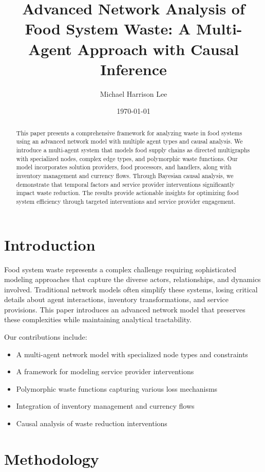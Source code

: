 \documentclass[12pt]{article}
\title{Advanced Network Analysis of Food System Waste: A Multi-Agent Approach with Causal Inference}
\author{Michael Harrison Lee}
\date{\today}
\theoremstyle{definition}
\begin{document}
\maketitle

\begin{abstract}
This paper presents a comprehensive framework for analyzing waste in food systems using an advanced network model with multiple agent types and causal analysis. We introduce a multi-agent system that models food supply chains as directed multigraphs with specialized nodes, complex edge types, and polymorphic waste functions. Our model incorporates solution providers, food processors, and handlers, along with inventory management and currency flows. Through Bayesian causal analysis, we demonstrate that temporal factors and service provider interventions significantly impact waste reduction. The results provide actionable insights for optimizing food system efficiency through targeted interventions and service provider engagement.
\end{abstract}

\section{Introduction}
Food system waste represents a complex challenge requiring sophisticated modeling approaches that capture the diverse actors, relationships, and dynamics involved. Traditional network models often simplify these systems, losing critical details about agent interactions, inventory transformations, and service provisions. This paper introduces an advanced network model that preserves these complexities while maintaining analytical tractability.

Our contributions include:
\begin{itemize}
    \item A multi-agent network model with specialized node types and constraints
    \item A framework for modeling service provider interventions
    \item Polymorphic waste functions capturing various loss mechanisms
    \item Integration of inventory management and currency flows
    \item Causal analysis of waste reduction interventions
\end{itemize}

\section{Methodology}
\end{document}
